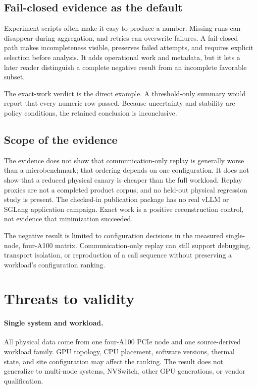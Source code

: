 \documentclass[10pt,twocolumn]{article}
\begin{document}
\subsection{Fail-closed evidence as the default}

Experiment scripts often make it easy to produce a number. Missing runs can
disappear during aggregation, and retries can overwrite failures. A fail-closed
path makes incompleteness visible, preserves failed attempts, and requires
explicit selection before analysis. It adds operational work and metadata, but
it lets a later reader distinguish a complete negative result from an
incomplete favorable subset.

The exact-work verdict is the direct example. A threshold-only summary would
report that every numeric row passed. Because uncertainty and stability are
policy conditions, the retained conclusion is inconclusive.

\subsection{Scope of the evidence}

The evidence does not show that communication-only replay is generally worse
than a microbenchmark; that ordering depends on one configuration. It does not
show that a reduced physical canary is cheaper than the full workload. Replay proxies are not a completed product corpus, and no
held-out physical regression study is present. The checked-in publication
package has no real vLLM or SGLang application campaign. Exact work is a
positive reconstruction control, not evidence that minimization succeeded.

The negative result is limited to configuration decisions in the measured
single-node, four-A100 matrix. Communication-only replay can still support
debugging, transport isolation, or reproduction of a call sequence without
preserving a workload's configuration ranking.

\section{Threats to validity}

\paragraph{Single system and workload.} All physical data come from one
four-A100 PCIe node and one source-derived workload family. GPU topology, CPU
placement, software versions, thermal state, and site configuration may affect
the ranking. The result does not generalize to multi-node systems, NVSwitch,
other GPU generations, or vendor qualification.
\end{document}
